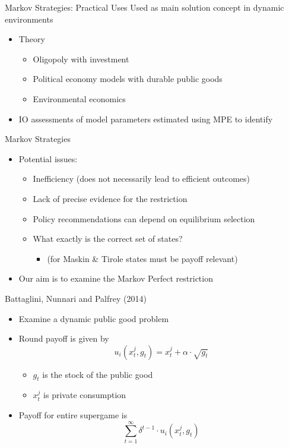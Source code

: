 \documentclass{beamer}
\begin{document}
\begin{frame}{Markov Strategies: Practical Uses}
Used as main solution concept in dynamic environments
\begin{itemize}
\item Theory

\begin{itemize}
\item Oligopoly with investment
\item Political economy models with durable public goods
\item Environmental economics
\end{itemize}
\item IO assessments of model parameters estimated using MPE to identify
\end{itemize}
\end{frame}
\begin{frame}{Markov Strategies }

\begin{itemize}
\item Potential issues:

\begin{itemize}
\item Inefficiency (does not necessarily lead to efficient outcomes)
\item Lack of precise evidence for the restriction
\item Policy recommendations can depend on equilibrium selection
\item What exactly is the correct set of states?

\begin{itemize}
\item (for Maskin \& Tirole states must be payoff relevant)
\end{itemize}
\end{itemize}
\item Our aim is to examine the Markov Perfect restriction
\end{itemize}
\end{frame}

\begin{frame}{Battaglini, Nunnari and Palfrey (2014)}
\begin{itemize}
	\item Examine a dynamic public good problem
	\item Round payoff is given by
	$$ u_i(x^j_t,g_t)=x^j_t+\alpha \cdot \sqrt{g_t}$$
	\begin{itemize}
	\item $g_t$ is the stock of the public good
	\item $x^j_t$ is private consumption
	\end{itemize} \pause
	\item Payoff for entire supergame is
	$$ \sum_{t=1}^{\infty} \delta^{t-1} \cdot u_i(x^j_t,g_t) $$
\end{itemize}
\end{frame}
\end{document}
